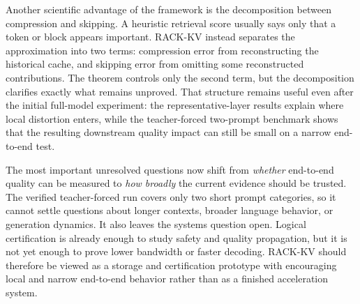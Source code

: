 Another scientific advantage of the framework is the decomposition between compression and skipping. A heuristic retrieval score usually says only that a token or block appears important. RACK-KV instead separates the approximation into two terms: compression error from reconstructing the historical cache, and skipping error from omitting some reconstructed contributions. The theorem controls only the second term, but the decomposition clarifies exactly what remains unproved. That structure remains useful even after the initial full-model experiment: the representative-layer results explain where local distortion enters, while the teacher-forced two-prompt benchmark shows that the resulting downstream quality impact can still be small on a narrow end-to-end test.

The most important unresolved questions now shift from \emph{whether} end-to-end quality can be measured to \emph{how broadly} the current evidence should be trusted. The verified teacher-forced run covers only two short prompt categories, so it cannot settle questions about longer contexts, broader language behavior, or generation dynamics. It also leaves the systems question open. Logical certification is already enough to study safety and quality propagation, but it is not yet enough to prove lower bandwidth or faster decoding. RACK-KV should therefore be viewed as a storage and certification prototype with encouraging local and narrow end-to-end behavior rather than as a finished acceleration system.
